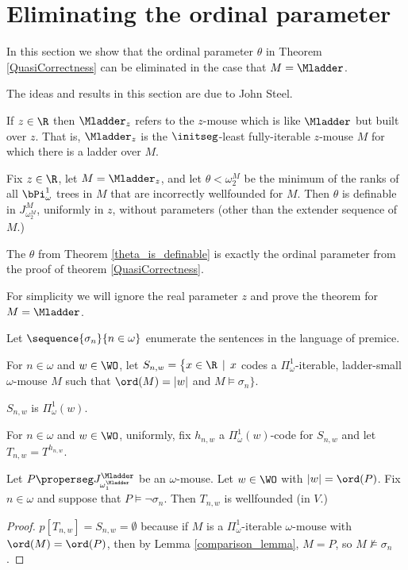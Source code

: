 \documentclass[oneside,12pt]{amsart}
\begin{document}
\section{Eliminating the ordinal parameter}
\label{section:eliminate_ordinal_parameters}

In this section we show that the ordinal parameter $\theta$ in Theorem
\ref{QuasiCorrectness} can be eliminated in the case that $M=\Mladder$.

The ideas and results in this section are due to John Steel.

\begin{definition}
If $z\in\R$ then $\Mladder_z$ refers to the $z$-mouse which is like $\Mladder$ but built over $z$.
That is, $\Mladder_z$ is the $\initseg$-least fully-iterable $z$-mouse $M$ for which there is
a ladder over $M$.
\end{definition}

\begin{theorem}
\label{theta_is_definable}
Fix $z\in\R$, let $M = \Mladder_z$, and let  $\theta<\omega_2^M$ be the
minimum of the ranks of all
$\bPi^1_{\omega}$ trees in $M$ that are  incorrectly wellfounded for $M$.
Then $\theta$ is definable in $J^M_{\omega_2^M}$, uniformly in $z$,
without parameters (other than the extender sequence of $M$.)
\end{theorem}

The $\theta$ from Theorem \ref{theta_is_definable} is exactly the ordinal parameter
from the proof of theorem \ref{QuasiCorrectness}.

For simplicity we will ignore the real parameter $z$ and prove the theorem for $M=\Mladder$.


\begin{definition}
Let $\sequence{\sigma_n}{n\in\omega}$ enumerate the sentences in the language of premice.

For $n\in\omega$ and $w\in\WO$, let
$S_{n,w}=\big\{x\in \R \,\mid\, x$  codes a $\Pi^1_{\omega}$-iterable,
ladder-small $\omega$-mouse $M$ such that $\ord(M)=|w|$ and  $M\models\sigma_n\big\}$.

$S_{n,w}$ is $\Pi^1_{\omega}(w)$.

For $n\in\omega$ and $w\in\WO$, uniformly, fix $h_{n,w}$ a $\Pi^1_{\omega}(w)$-code for $S_{n,w}$
and let $T_{n,w}=T^{h_{n,w}}$.
\end{definition}

\begin{lemma}
\label{T_n_w_correctly_wellfounded}
Let $P\properseg J^{\Mladder}_{\omega_1^{\Mladder}}$ be an $\omega$-mouse. Let $w\in\WO$ with
$|w|=\ord(P)$. Fix $n\in\omega$
and suppose that $P\models \neg \sigma_n$. Then $T_{n,w}$ is wellfounded (in $V$.)
\end{lemma}
\begin{proof}
$p[T_{n,w}]=S_{n,w} = \emptyset$ because if $M$ is a $\Pi^1_{\omega}$-iterable $\omega$-mouse with
$\ord(M) = \ord(P)$, then by Lemma \ref{comparison_lemma}, $M=P$, so $M\not\models\sigma_n$.
\end{proof}
\end{document}
